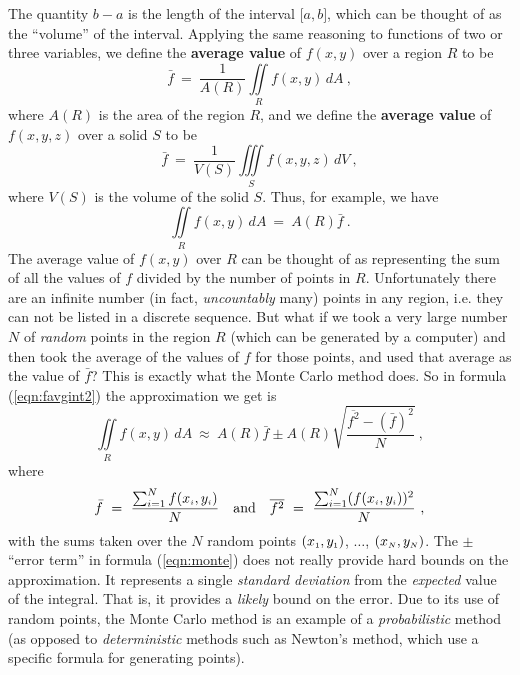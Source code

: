 The quantity $b-a$ is the length of the interval $\lbrack a,b \rbrack$, which can be thought of as the ``volume'' of
the interval. Applying the same reasoning to functions of two or three variables, we define the \textbf{average
value} of $f(x,y)$ over a region $R$ to be
\begin{equation}\label{eqn:favg2}
 \bar{f} ~=~ \frac{1}{A(R)}\iint\limits_{R} f(x,y)\,dA ~,
\end{equation}
where $A(R)$ is the area of the region $R$, and we define the \textbf{average
value} of $f(x,y,z)$ over a solid $S$ to be
\begin{equation}\label{eqn:favg3}
 \bar{f} ~=~ \frac{1}{V(S)}\iiint\limits_{S} f(x,y,z)\,dV ~,
\end{equation}
where $V(S)$ is the volume of the solid $S$. Thus, for example, we have
\begin{equation}\label{eqn:favgint2}
 \iint\limits_{R} f(x,y)\,dA ~=~ A(R)\bar{f} ~.
\end{equation}
The average value of $f(x,y)$ over $R$ can be thought of as representing the sum of all the values of $f$ divided by
the number of points in $R$. Unfortunately there are an infinite number (in fact, \emph{uncountably} many) points
in any region, i.e. they can not be listed in a discrete sequence. But what if we took a
very large number $N$ of \emph{random} points in the region $R$ (which can be generated by a computer) and then took the
average of the values of $f$ for those points, and used that
average as the value of $\bar{f}$? This is exactly what the Monte Carlo method does. So in formula (\ref{eqn:favgint2})
the approximation we get is
\begin{equation}\label{eqn:monte}
 \iint\limits_{R} f(x,y)\,dA ~\approx~ A(R)\bar{f} \pm A(R)\sqrt{\frac{\overline{f^2} - (\bar{f})^2}{N}} ~,
\end{equation}
where
\begin{equation}
 \bar{f} ~=~ \frac{\sum_{i=1}^N f(x_{\scriptscriptstyle i},y_{\scriptscriptstyle i})}{N} \quad \text{and} \quad \overline{f^2} ~=~
 \frac{\sum_{i=1}^N (f(x_{\scriptscriptstyle i},y_{\scriptscriptstyle i}))^2}{N} ~,
\end{equation}
with the sums taken over the $N$ random points $(x_{\scriptscriptstyle 1},y_{\scriptscriptstyle 1})$, $\ldots$, $(x_{\scriptscriptstyle N},y_{\scriptscriptstyle N})$.
The $\pm$ ``error term'' in formula (\ref{eqn:monte}) does not really provide
hard bounds on the approximation. It represents a single \emph{standard deviation} from the \emph{expected} value of the
integral. That is, it provides a \emph{likely} bound on the error. Due to its use of random points, the Monte Carlo
method is an example of a \emph{probabilistic} method (as opposed to \emph{deterministic} methods such as Newton's
method, which use a specific formula for generating points).


